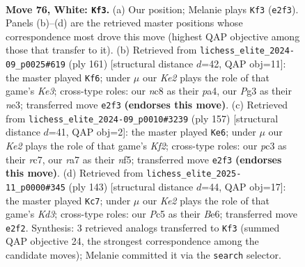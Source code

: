 \documentclass[11pt]{article}
\begin{document}
\clearpage

\begin{figure}[p]\centering
\begin{subfigure}{0.46\textwidth}\centering
\resizebox{\linewidth}{!}{%
\newchessgame
\chessboard[
  setfen={1Rnk4/r7/P7/2P4p/8/2pB2PP/2P1K3/8 w - - 1 76},
  showmover=false,
  pgfstyle=straightmove, color=movearrow, markmove={e2-f3}
]}
\caption{}
\end{subfigure}\hfill
\begin{subfigure}{0.46\textwidth}\centering
\resizebox{\linewidth}{!}{%
\newchessgame
\chessboard[
  setfen={8/7p/p3k2P/R7/PP2p3/2KbN3/r7/8 b - - 3 81},
  showmover=false,
  pgfstyle=straightmove, color=movearrow, markmove={e6-f6}
]}
\caption{}
\end{subfigure}
\\[4pt]
\begin{subfigure}{0.46\textwidth}\centering
\resizebox{\linewidth}{!}{%
\newchessgame
\chessboard[
  setfen={5b2/2R2k2/7p/1P2pNp1/4P1P1/3K4/8/1r6 b - - 6 79},
  showmover=false,
  pgfstyle=straightmove, color=movearrow, markmove={f7-e6}
]}
\caption{}
\end{subfigure}\hfill
\begin{subfigure}{0.46\textwidth}\centering
\resizebox{\linewidth}{!}{%
\newchessgame
\chessboard[
  setfen={1r6/3P4/1N1kb1p1/7p/3K3P/6P1/p7/R7 b - - 21 72},
  showmover=false,
  pgfstyle=straightmove, color=movearrow, markmove={d6-c7}
]}
\caption{}
\end{subfigure}
\caption{\textbf{Move 76, White: \texttt{Kf3}.} (a) Our position; Melanie plays \texttt{Kf3} (\texttt{e2f3}). Panels (b)--(d) are the retrieved master positions whose correspondence most drove this move (highest QAP objective among those that transfer to it). (b) Retrieved from \texttt{lichess\_elite\_2024-09\_p0025\#619} (ply 161) [structural distance $d$=42, QAP obj=11]: the master played \texttt{Kf6}; under $\mu$ our \emph{Ke2} plays the role of that game's \emph{Ke3}; cross-type roles: our \emph{n}c8 as their \emph{p}a4, our \emph{P}g3 as their \emph{n}e3; transferred move \texttt{e2f3} \textbf{(endorses this move)}. (c) Retrieved from \texttt{lichess\_elite\_2024-09\_p0010\#3239} (ply 157) [structural distance $d$=41, QAP obj=2]: the master played \texttt{Ke6}; under $\mu$ our \emph{Ke2} plays the role of that game's \emph{Kf2}; cross-type roles: our \emph{p}c3 as their \emph{r}c7, our \emph{r}a7 as their \emph{n}f5; transferred move \texttt{e2f3} \textbf{(endorses this move)}. (d) Retrieved from \texttt{lichess\_elite\_2025-11\_p0000\#345} (ply 143) [structural distance $d$=44, QAP obj=17]: the master played \texttt{Kc7}; under $\mu$ our \emph{Ke2} plays the role of that game's \emph{Kd3}; cross-type roles: our \emph{P}c5 as their \emph{B}e6; transferred move \texttt{e2f2}. Synthesis: 3 retrieved analogs transferred to \texttt{Kf3} (summed QAP objective 24, the strongest correspondence among the candidate moves); Melanie committed it via the \texttt{search} selector.}
\label{fig:thought-m150}
\end{figure}
\end{document}
